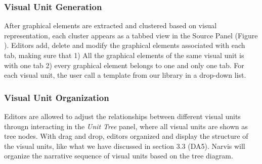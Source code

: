 \subsubsection{Visual Unit Generation} 
After graphical elements are extracted and clustered based on visual representation, each cluster appears as a tabbed view in the Source Panel (Figure ). 
Editors add, delete and modify the graphical elements associated with each tab, making sure that 1) All the graphical elements of the same visual unit is with one tab 2) every graphical element belongs to one and only one tab. For each visual unit, the user call a template from our library in a drop-down list. 

\subsubsection{Visual Unit Organization} 
Editors are allowed to adjust the relationships between different visual units througn interacting in the \textit{Unit Tree} panel, where all visual units are shown as tree nodes.
With drag and drop, editors organized and display the structure of the visual units, like what we have discussed in section 3.3 (DA5). 
Narvis will organize the narrative sequence of visual units based on the tree diagram. 

